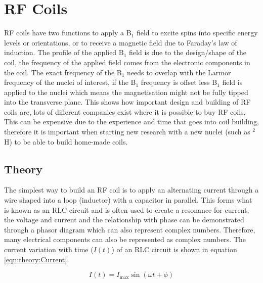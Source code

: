 \documentclass[class=article, crop=false]{standalone}
\begin{document}

\section{RF Coils}

RF coils have two functions to apply a B$_1$ field to excite spins into specific energy levels or orientations, or to receive a magnetic field due to Faraday's law of induction. The profile of the applied B$_1$ field is due to the design/shape of the coil, the frequency of the applied field comes from the electronic components in the coil. The exact frequency of the B$_1$ needs to overlap with the Larmor frequency of the nuclei of interest, if the B$_1$ frequency is offset less B$_1$ field is applied to the nuclei which means the magnetisation might not be fully tipped into the transverse plane. This shows how important design and building of RF coils are, lots of different companies exist where it is possible to buy RF coils. This can be expensive due to the experience and time that goes into coil building, therefore it is important when starting new research with a new nuclei (such as $^2$H) to be able to build home-made coils. 

\subsection{Theory}

The simplest way to build an RF coil is to apply an alternating current through a wire shaped into a loop (inductor) with a capacitor in parallel. This forms what is known as an RLC circuit and is often used to create a resonance for current, the voltage and current and the relationship with phase can be demonstrated through a phasor diagram which can also represent complex numbers. Therefore, many electrical components can also be represented as complex numbers. The current variation with time ($I(t)$) of an RLC circuit is shown in equation \ref{eqn:theory:Current}.

\begin{equation}
    I(t) = I_{\mathrm{max}}\sin(\omega t + \phi)
    \label{eqn:theory:Current}
\end{equation}
\end{document}
